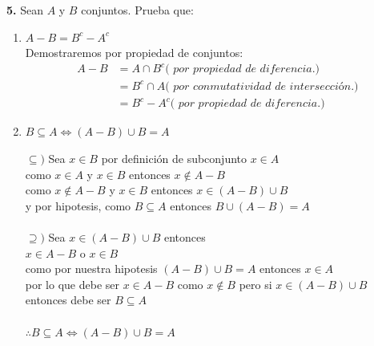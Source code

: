 \documentclass[12pt]{article}
\begin{document}
%
%
\textbf{5.} Sean $A$ y $B$ conjuntos. Prueba que:
\begin{enumerate}[label=\alph*)]
    \item $A - B = B^c - A^c$\\
    Demostraremos por propiedad de conjuntos:
    \begin{align*}
        A - B &= A \cap B^c \textit{( por propiedad de diferencia.)}\\
        &= B^c \cap A \textit{( por conmutatividad de intersección.)}\\
        &= B^c - A^c \textit{( por propiedad de diferencia.)}
    \end{align*}

    \item $B \subseteq A \Longleftrightarrow (A - B) \cup B = A$

    $\subseteq)$ Sea $x \in B$ por definición de subconjunto $x \in A$\\
    como $x \in A$ y $x \in B$ entonces $x \notin A - B$\\
    como $x \notin A - B$ y $x \in B$ entonces $x \in (A - B) \cup B$\\
    y por hipotesis, como $B \subseteq A$ entonces $B \cup (A - B) = A$\\
    \\
    $\supseteq)$ Sea $x \in (A - B) \cup B$ entonces\\
    $x \in A - B$ o $x \in B$\\
    como por nuestra hipotesis $(A - B) \cup B = A$ entonces $x \in A$\\
    por lo que debe ser $x \in A - B$
    como $x \notin B$ pero si $x \in (A - B) \cup B$ entonces debe ser $B \subseteq A$\\
    \\
    $\therefore B \subseteq A \Longleftrightarrow (A - B) \cup B = A$
\end{enumerate}
\end{document}
